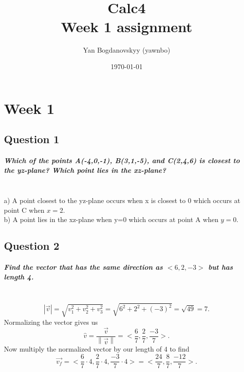 \documentclass{report}
\title{\Huge{Calc4}\\ Week 1 assignment }
\author{\huge{Yan Bogdanovskyy (yawnbo)}}
\date{\today}
\begin{document}
\maketitle
\newpage%

\pagebreak

\chapter{Week 1}
\section{Question 1}%
\label{sec:Question 1}

\paragraph{Which of the points A(-4,0,-1), B(3,1,-5), and C(2,4,6) is closest to the yz-plane? Which point lies in the xz-plane? \\ \\} 

a) A point closest to the yz-plane occurs when x is closest to 0 which occurs at point C when $ x=2 $. \\

b) A point lies in the xz-plane when y=0 which occurs at point A when $ y=0 $.

\section{Question 2}%
\label{sec: Question 2 }

\paragraph{Find the vector that has the same direction as $ < 6,2,-3 > $ but has length 4. \\ \\}

\[
	\left| \vec{v} \right| = \sqrt{ v_1^2+v_2^2+v_3^2 } = \sqrt{ 6^2+2^2+(-3)^2 } = \sqrt{ 49 } = 7
.\] 
Normalizing the vector gives us
\[
\hat{ v } = \frac{ \vec{{v}}}{ \left\| \vec{{ v }} {} \right\| } = < \frac{ 6 }{ 7 }, \frac{ 2 }{ 7 }, \frac{ -3 }{ 7 } >
.\] 
Now multiply the normalized vector by our length of 4 to find
\[
	\vec{{ v_f }} = < \frac{ 6 }{ 7 } \cdot 4, \frac{ 2 }{ 7 } \cdot 4, \frac{ -3 }{ 7 } \cdot 4 > = < \frac{ 24 }{ 7 }, \frac{ 8 }{ 7 }, \frac{ -12 }{ 7 } >
.\] 
\end{document}
